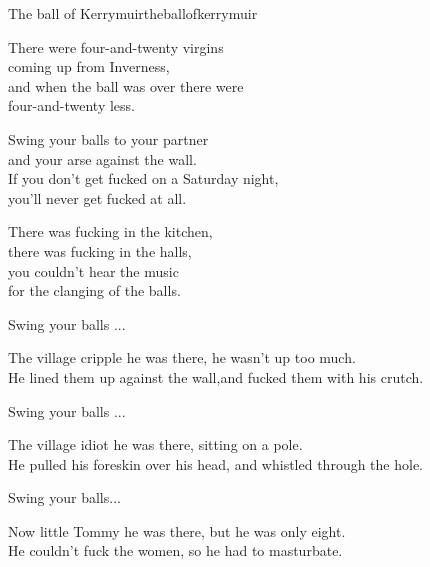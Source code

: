 \begin{song}{The ball of Kerrymuir}{theballofkerrymuir}
\begin{vers}
There were four-and-twenty virgins\\
coming up from Inverness,\\
and when the ball was over there were\\
four-and-twenty less.\\
\end{vers}
\begin{vers}
Swing your balls to your partner\\
and your arse against the wall.\\
If you don't get fucked on a Saturday night,\\
you'll never get fucked at all.
\end{vers}
\begin{vers}
There was fucking in the kitchen,\\
there was fucking in the halls,\\
you couldn't hear the music\\
for the clanging of the balls.\\
\end{vers}
\begin{vers}
Swing your balls ...\\
\end{vers}
\begin{vers}
The village cripple he was there, he wasn't up too much.\\
He lined them up against the wall,and fucked them with his crutch.\\
\end{vers}
\begin{vers}
Swing your balls ...\\
\end{vers}
\begin{vers}
The village idiot he was there, sitting on a pole.\\
He pulled his foreskin over his head, and whistled through the hole.\\
\end{vers}
\begin{vers}
Swing your balls...\\
\end{vers}
\begin{vers}
Now little Tommy he was there, but he was only eight.\\
He couldn't fuck the women, so he had to masturbate.\\

\end{vers}
\end{song}
